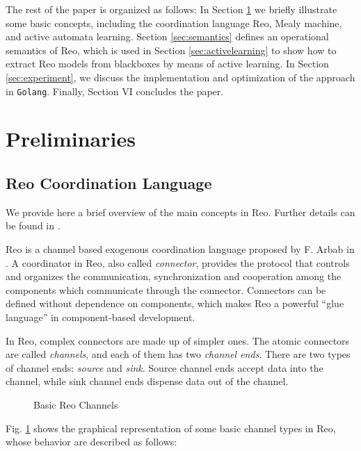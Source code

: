\documentclass[conference, a4paper]{IEEEtran}
\begin{document}
The rest of the paper is organized as follows: In Section
\ref{sec:preliminaries} we briefly illustrate some basic concepts, including the coordination
language Reo, Mealy machine, and active automata learning. Section \ref{sec:semantics} defines an
operational semantics of Reo, which is used in Section \ref{sec:activelearning} to show how to
extract Reo models from blackboxes by means of active learning. In Section
\ref{sec:experiment}, we discuss the implementation and optimization of the approach in
\texttt{Golang}. Finally, Section VI concludes the paper.

\section{Preliminaries} 
\label{sec:preliminaries}
\subsection{Reo Coordination Language} 
\label{sec:reo}
We provide here a brief overview of the main concepts in Reo. Further details can be found in
\cite{DBLP:journals/mscs/Arbab04, DBLP:journals/scp/BaierSAR06}.

Reo is a channel based exogenous coordination language proposed by F. Arbab in
\cite{DBLP:journals/mscs/Arbab04}. 
A coordinator in Reo, also called \emph{connector}, provides the protocol that controls and
organizes the communication, synchronization and cooperation among the components which
communicate through the connector. Connectors can be defined without dependence on components,
which makes Reo a powerful ``glue language'' in component-based
development\cite{DBLP:journals/sigsoft/Gill03}.

In Reo, complex connectors are made up of simpler ones. The atomic connectors are called
\emph{channels}, and each of them has two \emph{channel ends}. There are two types of channel ends:
\emph{source} and \emph{sink}. Source channel ends accept data into the channel, while sink
channel ends dispense data out of the channel. 

\begin{figure}[ht]
  \begin{center}
    
  \end{center}
  \caption{Basic Reo Channels}
  \label{fig:basic}
\end{figure}

Fig. \ref{fig:basic} shows the graphical representation of some basic channel types in Reo, whose
behavior are described as follows:
\end{document}
